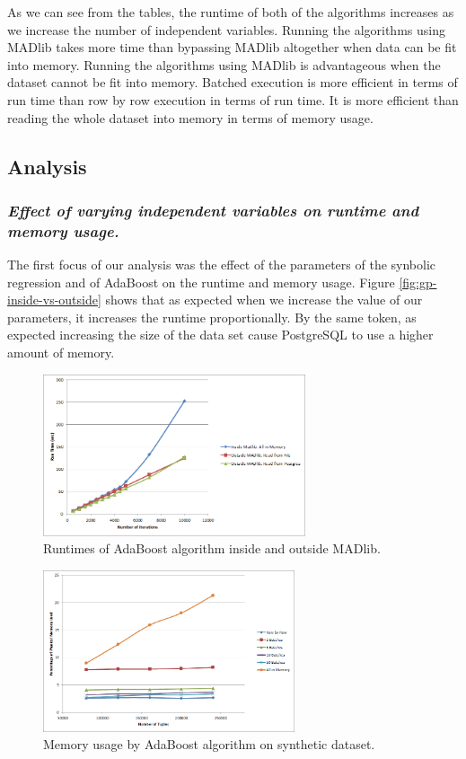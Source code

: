 As we can see from the tables, the runtime of both of the algorithms increases as we increase the number of independent variables. Running the algorithms using MADlib takes more time than bypassing MADlib altogether when data can be fit into memory. Running the algorithms using MADlib is advantageous when the dataset cannot be fit into memory. Batched execution is more efficient in terms of run time than row by row execution in terms of run time. It is more efficient than reading the whole dataset into memory in terms of memory usage.

\subsection{Analysis}
\subsubsection*{\itshape Effect of varying independent variables on runtime and memory usage.}

The first focus of our analysis was the effect of the parameters of the synbolic regression and of AdaBoost on the runtime and memory usage. Figure \ref{fig:gp-inside-vs-outside} shows that as expected when we increase the value of our parameters, it increases the runtime proportionally. By the same token, as expected increasing the size of the data set cause PostgreSQL to use a higher amount of memory.


\begin{figure}[ht]
\centering
\includegraphics[height=180px]{ada1.png}
\caption{Runtimes of AdaBoost algorithm inside and outside MADlib.}
\label{fig:adainout}
\end{figure}


\begin{figure}[ht]
\centering
\includegraphics[height=180px]{ada4.png}
\caption{Memory usage by AdaBoost algorithm on synthetic dataset.}
\label{fig:adamem}
\end{figure}

